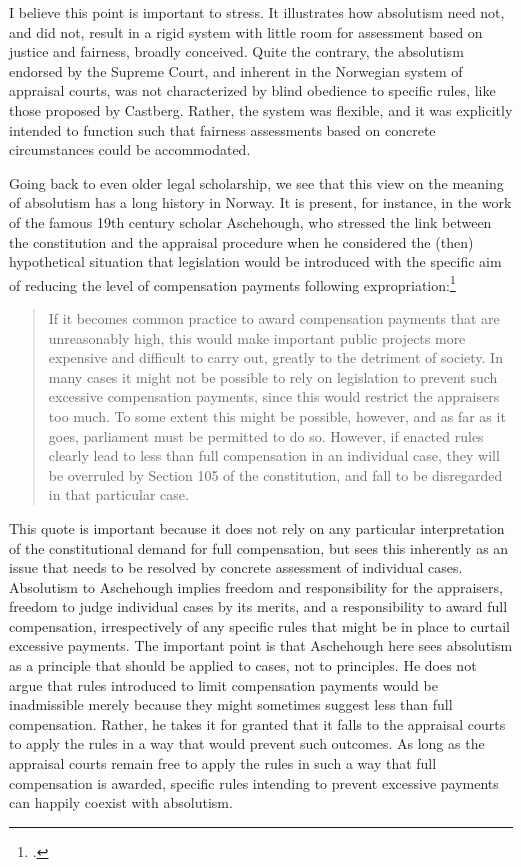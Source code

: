 I believe this point is important to stress. It illustrates how absolutism need not, and did not, result in a rigid system with little room for assessment based on justice and fairness, broadly conceived. Quite the contrary, the absolutism endorsed by the Supreme Court, and inherent in the Norwegian system of appraisal courts, was not characterized by blind obedience to specific rules, like those proposed by Castberg. Rather, the system was flexible, and it was explicitly intended to function such that fairness assessments based on concrete circumstances could be accommodated. 

Going back to even older legal scholarship, we see that this view on the meaning of absolutism has a long history in Norway. It is present, for instance, in the work of the famous 19th century scholar Aschehough, who stressed the link between the constitution and the appraisal procedure when he considered the (then) hypothetical situation that legislation would be introduced with the specific aim of reducing the level of compensation payments following expropriation:\footcite[p.48]{asch} 

\begin{quote}
If it becomes common practice to award compensation payments that are unreasonably high, this would make important public projects more expensive and difficult to carry out, greatly to the detriment of society. In many cases it might not be possible to rely on legislation to prevent such excessive compensation payments, since this would restrict the appraisers too much. To some extent this might be possible, however, and as far as it goes, parliament must be permitted to do so. However, if enacted rules clearly lead to less than full compensation in an individual case, they will be overruled by Section 105 of the constitution, and fall to be disregarded in that particular case.
\end{quote}

This quote is important because it does not rely on any particular interpretation of the constitutional demand for full compensation, but sees this inherently as an issue that needs to be resolved by concrete assessment of individual cases. Absolutism to Aschehough implies freedom and responsibility for the appraisers, freedom to judge individual cases by its merits, and a responsibility to award full compensation, irrespectively of any specific rules that might be in place to curtail excessive payments. The important point is that Aschehough here sees absolutism as a principle that should be applied to cases, not to principles. He does not argue that rules introduced to limit compensation payments would be inadmissible merely because they might sometimes suggest less than full compensation. Rather, he takes it for granted that it falls to the appraisal courts to apply the rules in a way that would prevent such outcomes. As long as the appraisal courts remain free to apply the rules in such a way that full compensation is awarded, specific rules intending to prevent excessive payments can happily coexist with absolutism.

